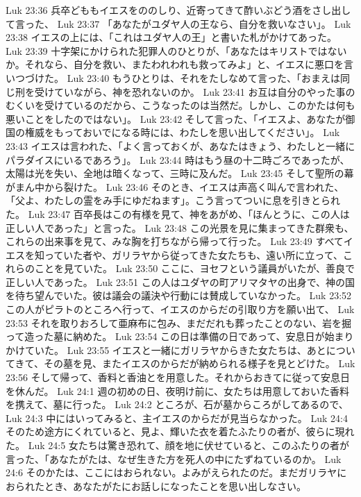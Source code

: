 Luk 23:36  兵卒どももイエスをののしり、近寄ってきて酢いぶどう酒をさし出して言った、
Luk 23:37  「あなたがユダヤ人の王なら、自分を救いなさい」。
Luk 23:38  イエスの上には、「これはユダヤ人の王」と書いた札がかけてあった。
Luk 23:39  十字架にかけられた犯罪人のひとりが、「あなたはキリストではないか。それなら、自分を救い、またわれわれも救ってみよ」と、イエスに悪口を言いつづけた。
Luk 23:40  もうひとりは、それをたしなめて言った、「おまえは同じ刑を受けていながら、神を恐れないのか。
Luk 23:41  お互は自分のやった事のむくいを受けているのだから、こうなったのは当然だ。しかし、このかたは何も悪いことをしたのではない」。
Luk 23:42  そして言った、「イエスよ、あなたが御国の権威をもっておいでになる時には、わたしを思い出してください」。
Luk 23:43  イエスは言われた、「よく言っておくが、あなたはきょう、わたしと一緒にパラダイスにいるであろう」。
Luk 23:44  時はもう昼の十二時ごろであったが、太陽は光を失い、全地は暗くなって、三時に及んだ。
Luk 23:45  そして聖所の幕がまん中から裂けた。
Luk 23:46  そのとき、イエスは声高く叫んで言われた、「父よ、わたしの霊をみ手にゆだねます」。こう言ってついに息を引きとられた。
Luk 23:47  百卒長はこの有様を見て、神をあがめ、「ほんとうに、この人は正しい人であった」と言った。
Luk 23:48  この光景を見に集まってきた群衆も、これらの出来事を見て、みな胸を打ちながら帰って行った。
Luk 23:49  すべてイエスを知っていた者や、ガリラヤから従ってきた女たちも、遠い所に立って、これらのことを見ていた。
Luk 23:50  ここに、ヨセフという議員がいたが、善良で正しい人であった。
Luk 23:51  この人はユダヤの町アリマタヤの出身で、神の国を待ち望んでいた。彼は議会の議決や行動には賛成していなかった。
Luk 23:52  この人がピラトのところへ行って、イエスのからだの引取り方を願い出て、
Luk 23:53  それを取りおろして亜麻布に包み、まだだれも葬ったことのない、岩を掘って造った墓に納めた。
Luk 23:54  この日は準備の日であって、安息日が始まりかけていた。
Luk 23:55  イエスと一緒にガリラヤからきた女たちは、あとについてきて、その墓を見、またイエスのからだが納められる様子を見とどけた。
Luk 23:56  そして帰って、香料と香油とを用意した。それからおきてに従って安息日を休んだ。
Luk 24:1  週の初めの日、夜明け前に、女たちは用意しておいた香料を携えて、墓に行った。
Luk 24:2  ところが、石が墓からころがしてあるので、
Luk 24:3  中にはいってみると、主イエスのからだが見当らなかった。
Luk 24:4  そのため途方にくれていると、見よ、輝いた衣を着たふたりの者が、彼らに現れた。
Luk 24:5  女たちは驚き恐れて、顔を地に伏せていると、このふたりの者が言った、「あなたがたは、なぜ生きた方を死人の中にたずねているのか。
Luk 24:6  そのかたは、ここにはおられない。よみがえられたのだ。まだガリラヤにおられたとき、あなたがたにお話しになったことを思い出しなさい。
